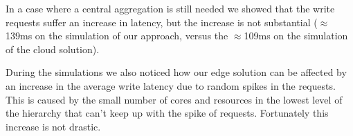 In a case where a central aggregation is still needed we showed that the write requests suffer an increase in latency, but the increase is not substantial ($\approx$139ms on the simulation of our approach, versus the $\approx$109ms on the simulation of the cloud solution).

During the simulations we also noticed how our edge solution can be affected by an increase in the average write latency due to random spikes in the requests. This is caused by the small number of cores and resources in the lowest level of the hierarchy that can't keep up with the spike of requests. Fortunately this increase is not drastic.
